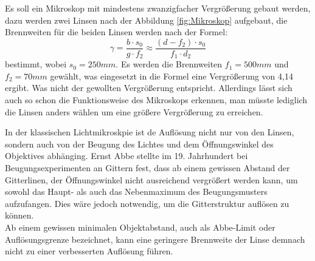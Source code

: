 Es soll ein Mikroskop mit mindestens zwanzigfacher Vergrößerung gebaut werden, dazu werden zwei Linsen nach der Abbildung \ref{fig:Mikroskop} aufgebaut, die Brennweiten für die beiden Linsen werden nach der Formel: $$ \gamma = \frac{b \cdot s_0}{g \cdot f_2 } \approx \frac{(d - f_2) \cdot s_0}{f_1 \cdot d_2}$$ bestimmt, wobei $s_0 = 250mm$. Es werden die Brennweiten $f_1 = 500mm$ und $f_2 = 70mm$ gewählt, was eingesetzt in die Formel eine Vergrößerung von 4,14 ergibt. Was nicht der gewollten Vergrößerung entspricht. Allerdings lässt sich auch so schon die Funktionsweise des Mikroskops erkennen, man müsste lediglich die Linsen anders wählen um eine größere Vergrößerung zu erreichen.

In der klassischen Lichtmikroskpie ist de Auflösung nicht nur von den Linsen, sondern auch von der Beugung des Lichtes und dem Öffnungswinkel des Objektives abhänging.
Ernst Abbe stellte im 19. Jahrhundert bei Beugungsexperimenten an Gittern fest, dass ab einem gewissen Abstand der Gitterlinen, der Öffnungswinkel nicht ausreichend vergrößert werden kann, um sowohl das Haupt- als auch das Nebenmaximum des Beugungsmusters aufzufangen.
Dies wäre jedoch notwendig, um die Gitterstruktur auflösen zu können.\\
Ab einem gewissen minimalen Objektabstand, auch als Abbe-Limit oder Auflösungsgrenze bezeichnet, kann eine geringere Brennweite der Linse demnach nicht zu einer verbesserten Auflösung führen.
